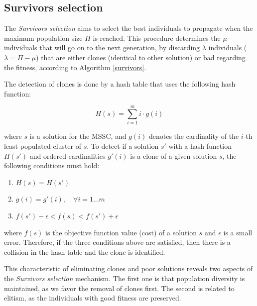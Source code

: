 \subsection{Survivors selection}
\label{subsec:survivors}
The \textit{Survivors selection} aims to select the best individuals to propagate when the maximum population size $\Pi$ is reached. This procedure determines the $\mu$ individuals that will go on to the next generation, by discarding $\lambda$ individuals ($\lambda = \Pi - \mu$) that are either clones (identical to other solution) or bad regarding the fitness, according to Algorithm \ref{survivors}.

The detection of clones is done by a hash table that uses the following hash function:

\begin{equation}
H(s) = \sum_{i=1}^{m}i \cdot g(i)
\end{equation}

\noindent where $s$ is a solution for the MSSC, and $g(i)$ denotes the cardinality of the $i$-th least populated cluster of $s$. To detect if a solution $s'$ with a hash function $H(s')$ and ordered cardinalities $g'(i)$ is a clone of a given solution $s$, the following conditions must hold:

\begin{enumerate}[label=\roman*)]
	\item $H(s) = H(s')$
	
	\item $g(i) = g'(i), \quad \forall i = 1 ... m$

	\item $f(s') - \epsilon < f(s) < f(s') + \epsilon$
\end{enumerate}

\noindent where $f(s)$ is the objective function value (cost) of a solution $s$ and $\epsilon$ is a small error. Therefore, if the three conditions above are satisfied, then there is a collision in the hash table and the clone is identified.

This characteristic of eliminating clones and poor solutions reveals two aspects of the \textit{Survivors selection} mechanism. The first one is that population diversity is maintained, as we favor the removal of clones first. The second is related to elitism, as the individuals with good fitness are preserved. %

